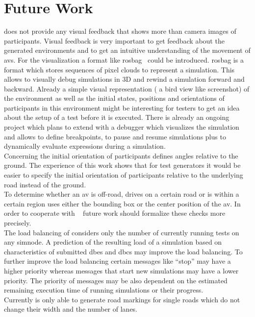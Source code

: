 \section{Future Work}
\drivebuild{} does not provide any visual feedback that shows more than camera images of participants.
Visual feedback is very important to get feedback about the generated environments and to get an intuitive understanding of the movement of \glspl{av}.
For the visualization a format like \gls{rosbag}~\cite{rosbag} could be introduced.
\Gls{rosbag} is a format which stores sequences of pixel clouds to represent a simulation.
This allows to visually debug simulations in 3D and rewind a simulation forward and backward.
Already a simple visual representation (\eg{} a bird view like screenshot) of the environment as well as the initial states, positions and orientations of participants in this environment might be interesting for testers to get an idea about the setup of a test before it is executed.
There is already an ongoing project which plans to extend \drivebuild{} with a debugger which visualizes the simulation and allows to define breakpoints, to pause and resume simulations plus to dynamically evaluate expressions during a simulation.\\
Concerning the initial orientation of participants \drivebuild{} defines angles relative to the ground.
The experience of this work shows that for test generators it would be easier to specify the initial orientation of participants relative to the underlying road instead of the ground.\\
To determine whether an \gls{av} is off-road, drives on a certain road or is within a certain region \drivebuild{} uses either the bounding box or the center position of the \gls{av}.
In order to cooperate with \beepbeep{}~\cite{beepbeep} future work should formalize these checks more precisely.\\
The load balancing of \drivebuild{} considers only the number of currently running tests on any \gls{simnode}.
A prediction of the resulting load of a simulation based on characteristics of submitted \glspl{dbe} and \glspl{dbc} may improve the load balancing.
To further improve the load balancing certain messages like \enquote{stop} may have a higher priority whereas messages that start new simulations may have a lower priority.
The priority of messages may be also dependent on the estimated remaining execution time of running simulations or their progress.\\
Currently \drivebuild{} is only able to generate road markings for single roads which do not change their width and the number of lanes.
